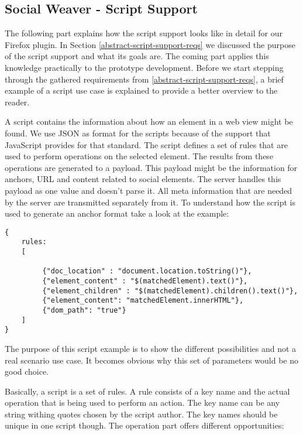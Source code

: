 \newpage
\subsection{Social Weaver - Script Support}\label{sowe-script-support}
The following part explains how the script support looks like in detail for our Firefox plugin. In Section \ref{abstract-script-support-reqs} we discussed the purpose of the script support and what its goals are. The coming part applies this knowledge practically to the prototype development. Before we start stepping through the gathered requirements from \ref{abstract-script-support-reqs}, a brief example of a script use case is explained to provide a better overview to the reader.

A script contains the information about how an element in a web view might be found. We use JSON as format for the scripts because of the support that JavaScript provides for that standard. The script defines a set of rules that are used to perform operations on the selected element. The results from these operations are generated to a payload. This payload might be the information for anchors, URL and content related to social elements. The server handles this payload as one value and doesn't parse it. All meta information that are needed by the server are transmitted separately from it. To understand how the script is used to generate an anchor format take a look at the example:

\begin{lstlisting}
{
    rules:
    [

         {"doc_location" : "document.location.toString()"},
         {"element_content" : "$(matchedElement).text()"},
         {"element_children" : "$(matchedElement).children().text()"},
         {"element_content": "matchedElement.innerHTML"},
         {"dom_path": "true"}	
    ]
}
\end{lstlisting}

The purpose of this script example is to show the different possibilities and not a real scenario use case. It 
 becomes obvious why this set of parameters would be no good choice. 

Basically, a script is a set of rules. A rule consists of a key name and the actual operation that is being used to perform an action. The key name can be any string withing quotes chosen by the script author. The key names should be unique in one script though. The operation part offers different opportunities:

